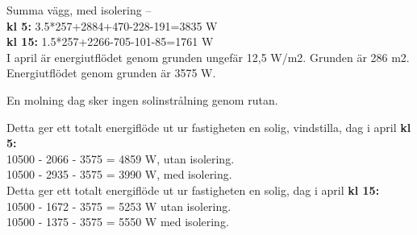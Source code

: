 Summa vägg, med isolering –\\
\textbf{kl 5:} 3.5*257+2884+470-228-191=3835 W\\
\textbf{kl 15:} 1.5*257+2266-705-101-85=1761 W\\

I april är energiutflödet genom grunden ungefär 12,5 W/m2. Grunden är 286 m2.\\
Energiutflödet genom grunden är 3575 W.

En molning dag sker ingen solinstrålning genom rutan.

Detta ger ett totalt energiflöde ut ur fastigheten en solig, vindstilla, dag i april \textbf{kl 5:}\\
10500 - 2066 - 3575 =  4859 W, utan isolering.\\
10500 - 2935 - 3575 =  3990 W, med isolering.\\

Detta ger ett totalt energiflöde ut ur fastigheten en solig, dag i april \textbf{kl 15:}\\
10500 - 1672 - 3575 = 5253 W utan isolering.\\
10500 - 1375 - 3575  =  5550 W med isolering.\\

